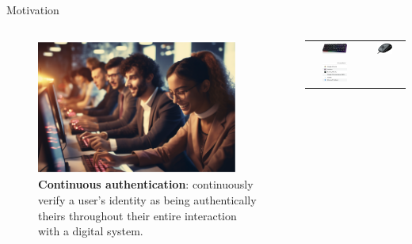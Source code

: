 \documentclass[10pt]{beamer}
\begin{document}
\begin{frame}{Motivation}

\begin{columns}[c,onlytextwidth]
    \begin{column}{0.48\textwidth}
        \centering
		\begin{figure}
	   \includegraphics[width=0.9\textwidth]{images/cont_auth}
	   \vfill 
	   \textbf{Continuous authentication}:  continuously verify a user’s identity as being authentically theirs throughout their entire interaction with a digital system. 
		\end{figure}
    \end{column}
    \pause 
    \begin{column}{0.48\textwidth}
        \centering
		\vfill 
	  \begin{tabular}{cc}
	 \includegraphics[width=0.5\textwidth]{images/keyboard} & \includegraphics[width=0.5\textwidth]{images/mouse} 
	  \\
 \includegraphics[width=0.5\textwidth]{images/activity_monitor} &

\end{tabular}
\end{column}
\end{columns}
\end{frame}
\end{document}
